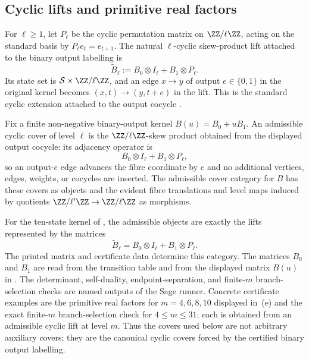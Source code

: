 \subsection{Cyclic lifts and primitive real factors}

For \(\ell\ge 1\), let \(P_\ell\) be the cyclic permutation matrix on
\(\ZZ/\ell\ZZ\), acting on the standard basis by
\(P_\ell e_t=e_{t+1}\). The natural \(\ell\)-cyclic skew-product lift attached to the binary output
labelling is
\[
  \widetilde B_\ell:=B_0\otimes I_\ell+B_1\otimes P_\ell.
\]
Its state set is \(\mathcal S\times\ZZ/\ell\ZZ\), and an edge
\(x\to y\) of output \(e\in\{0,1\}\) in the original kernel becomes
\((x,t)\to(y,t+e)\) in the lift. This is the standard cyclic extension
attached to the output cocycle
\cite{AdlerKitchensMarcus1985,Fiebig1993,BoyleSchmieding2017}.

\begin{definition}
  \label{def:admissible-cyclic-cover}
  Fix a finite non-negative binary-output kernel
  \(B(u)=B_0+uB_1\).  An admissible cyclic cover of level \(\ell\) is the
  \(\ZZ/\ell\ZZ\)-skew product obtained from the displayed output cocycle:
  its adjacency operator is
  \[
    B_0\otimes I_\ell+B_1\otimes P_\ell,
  \]
  so an output-\(e\) edge advances the fibre coordinate by \(e\) and no
  additional vertices, edges, weights, or cocycles are inserted.  The
  admissible cover category for \(B\) has these covers as objects and
  the evident fibre translations and level maps induced by quotients
  \(\ZZ/\ell'\ZZ\to\ZZ/\ell\ZZ\) as morphisms.

  For the ten-state kernel of , the admissible
  objects are exactly the lifts represented by the matrices
  \[
    \widetilde B_\ell=B_0\otimes I_\ell+B_1\otimes P_\ell.
  \]
  The printed matrix and certificate data determine this category.  The
  matrices \(B_0\) and \(B_1\) are read from the transition table and
  from the displayed matrix \(B(u)\) in
  .  The determinant, self-duality,
  endpoint-separation, and finite-\(m\) branch-selection checks are
  named outputs of the Sage runner.  Concrete
  certificate examples are the primitive real factors for
  \(m=4,6,8,10\) displayed in
  \,\textup{(e)} and the exact
  finite-\(m\) branch-selection check for \(4\le m\le31\); each is
  obtained from an admissible cyclic lift at level \(m\).  Thus the
  covers used below are not arbitrary auxiliary covers; they are the
  canonical cyclic covers forced by the certified binary output
  labelling.
\end{definition}

